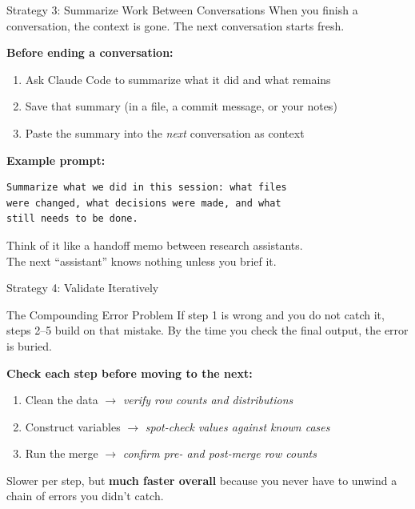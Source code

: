 \documentclass[aspectratio=169, 11pt]{beamer}
\begin{document}
\begin{frame}[fragile]{Strategy 3: Summarize Work Between Conversations}
  When you finish a conversation, the context is gone. The next conversation starts fresh.

  \vspace{0.8em}
  \textbf{Before ending a conversation:}
  \begin{enumerate}
    \item Ask Claude Code to summarize what it did and what remains
    \item Save that summary (in a file, a commit message, or your notes)
    \item Paste the summary into the \textit{next} conversation as context
  \end{enumerate}

  \vspace{0.8em}
  \textbf{Example prompt:}
  \begin{lstlisting}
Summarize what we did in this session: what files
were changed, what decisions were made, and what
still needs to be done.
  \end{lstlisting}

  \vspace{0.5em}
  \alert{Think of it like a handoff memo between research assistants.}\\
  The next ``assistant'' knows nothing unless you brief it.
\end{frame}

\begin{frame}{Strategy 4: Validate Iteratively}
  \begin{alertblock}{The Compounding Error Problem}
    If step 1 is wrong and you do not catch it, steps 2--5 build on that mistake. By the time you check the final output, the error is buried.
  \end{alertblock}

  \vspace{0.5em}
  \textbf{Check each step before moving to the next:}
  \begin{enumerate}
    \item Clean the data $\rightarrow$ \textit{verify row counts and distributions}
    \item Construct variables $\rightarrow$ \textit{spot-check values against known cases}
    \item Run the merge $\rightarrow$ \textit{confirm pre- and post-merge row counts}
  \end{enumerate}

  \vspace{0.5em}
  Slower per step, but \textbf{much faster overall} because you never have to unwind a chain of errors you didn't catch.
\end{frame}
\end{document}

